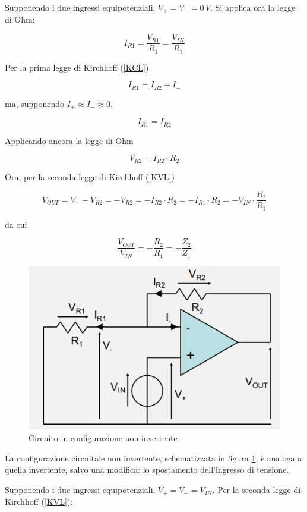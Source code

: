 \documentclass{article}
\begin{document}
Supponendo i due ingressi equipotenziali, $V_+ = V_- = 0\, V$. Si applica ora la legge di Ohm:

\[I_{R1} = \frac{V_{R1}}{R_1} = \frac{V_{IN}}{R_1}\]

Per la prima legge di Kirchhoff (\ref{KCL})

\[I_{R1} = I_{R2} + I_{-}\]

ma, supponendo $I_{+} \approx I_{-} \approx 0$,

\[I_{R1} = I_{R2}\]

Applicando ancora la legge di Ohm

\[V_{R2} = I_{R2} \cdot R_2\]

Ora, per la seconda legge di Kirchhoff (\ref{KVL})

\[V_{OUT} = V_- - V_{R2} = - V_{R2} = - I_{R2} \cdot R_2 = - I_{R1} \cdot R_{2} = - V_{IN} \cdot \frac{R_{2}}{R_{1}}\]

da cui 

\[\frac{V_{OUT}}{V_{IN}} = - \frac{R_2}{R_1} = - \frac{Z_2}{Z_1}\]

\clearpage
\begin{figure}[h]
  \centering
  \includegraphics[scale=0.7]{IM_circuito_non_invertente}
  \caption{Circuito in configurazione non invertente}
  \label{Schema_circuito_non_invertente}
\end{figure}

La configurazione circuitale non invertente, schematizzata in figura \ref{Schema_circuito_non_invertente}, è analoga a quella invertente, salvo una modifica: lo spostamento dell'ingresso di tensione.

Supponendo i due ingressi equipotenziali, $V_+ = V_- = V_{IN}$. Per la seconda legge di Kirchhoff (\ref{KVL}):
\end{document}
